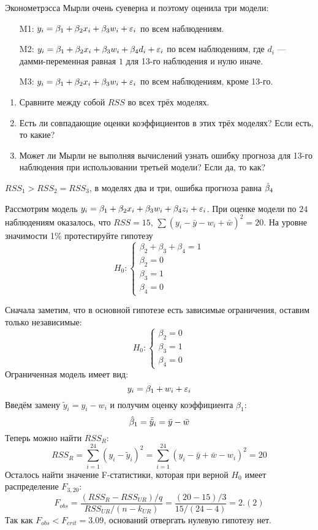 \begin{problem}
Эконометрэсса Мырли очень суеверна и поэтому оценила три модели:
\begin{enumerate}
\item[M1:] $y_i=\beta_1 + \beta_2 x_i + \beta_3 w_i + \varepsilon_i$ по всем наблюдениям.
\item[M2:] $y_i=\beta_1 + \beta_2 x_i + \beta_3 w_i + \beta_4 d_i + \varepsilon_i$ по всем наблюдениям, где $d_i$ — дамми-переменная равная $1$ для 13-го наблюдения и нулю иначе.
\item[M3:] $y_i=\beta_1 + \beta_2 x_i + \beta_3 w_i + \varepsilon_i$ по всем наблюдениям, кроме 13-го.
\end{enumerate}

\begin{enumerate}
\item Сравните между собой $RSS$ во всех трёх моделях.
\item Есть ли совпадающие оценки коэффициентов в этих трёх моделях? Если есть, то какие?
\item Может ли Мырли не выполняя вычислений узнать ошибку прогноза для 13-го наблюдения при использовании третьей модели? Если да, то как?
\end{enumerate}


\begin{sol}
$RSS_1 > RSS_2 = RSS_3$, в моделях два и три, ошибка прогноза равна $\hat{\beta}_4$
\end{sol}
\end{problem}


\begin{problem} %
Рассмотрим модель $y_i = \beta_1+ \beta_2 x_i + \beta_3 w_i +\beta_4 z_i + \varepsilon_i$.  При оценке модели по $24$ наблюдениям оказалось, что $RSS=15$, $\sum (y_i-\bar{y}-w_i+\bar{w})^2=20$. На уровне значимости 1\% протестируйте гипотезу
\[
H_0:
\begin{cases}
\beta_2+\beta_3+\beta_4=1 \\
\beta_2=0 \\
\beta_3=1 \\
\beta_4=0
\end{cases}
\]


\begin{sol}
Сначала заметим, что в основной гипотезе есть зависимые ограничения, оставим только независимые:
\[
H_0:
\begin{cases}
\beta_2=0 \\
\beta_3=1 \\
\beta_4=0
\end{cases}
\]
Ограниченная модель имеет вид:
\[
y_i = \beta_1 + w_i + \varepsilon_i
\]
Введём замену $\tilde{y}_i = y_i - w_i$ и получим оценку коэффициента $\beta_1$:
\[
\hat{\beta}_1 = \bar{\tilde{y}}_i = \bar y - \bar w
\]
Теперь можно найти $RSS_R$:
\[
RSS_R = \sum_{i=1}^{24} (y_i - \hat{\tilde{y}}_i)^2 = \sum_{i=1}^{24} (y_i - \bar y + \bar w - w_i)^2 = 20
\]
Осталось найти значение F-статистики, которая при верной $H_0$ имеет распределение $F_{3, 20}$:
\[
F_{obs} = \frac{(RSS_R - RSS_{UR})/q}{RSS_{UR}/(n-k_{UR})} = \frac{(20-15)/3}{15/(24-4)} = 2.(2)
\]
Так как $F_{obs} < F_{crit} = 3.09$, оснований отвергать нулевую гипотезу нет.
\end{sol}
\end{problem}



